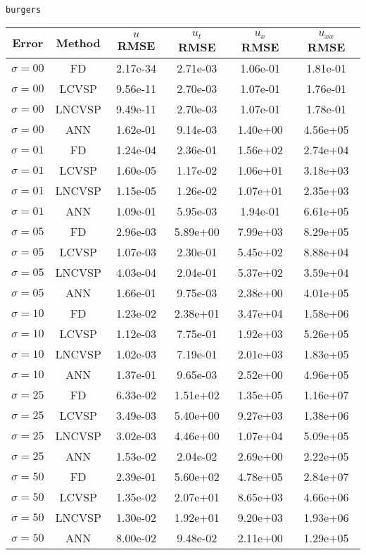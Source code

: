 \verb+burgers+
\begin{tabular}{cccccc}
    Error & Method & $u$ RMSE & $u_{t}$ RMSE & $u_{x}$ RMSE & $u_{xx}$ RMSE \\ 
    \hline
    $\sigma = 00$ & FD & 2.17e-34 & 2.71e-03 & 1.06e-01 & 1.81e-01 \\
    $\sigma = 00$ & LCVSP & 9.56e-11 & 2.70e-03 & 1.07e-01 & 1.76e-01 \\
    $\sigma = 00$ & LNCVSP & 9.49e-11 & 2.70e-03 & 1.07e-01 & 1.78e-01 \\
    $\sigma = 00$ & ANN & 1.62e-01 & 9.14e-03 & 1.40e+00 & 4.56e+05 \\
    \hline
    $\sigma = 01$ & FD & 1.24e-04 & 2.36e-01 & 1.56e+02 & 2.74e+04 \\
    $\sigma = 01$ & LCVSP & 1.60e-05 & 1.17e-02 & 1.06e+01 & 3.18e+03 \\
    $\sigma = 01$ & LNCVSP & 1.15e-05 & 1.26e-02 & 1.07e+01 & 2.35e+03 \\
    $\sigma = 01$ & ANN & 1.09e-01 & 5.95e-03 & 1.94e-01 & 6.61e+05 \\
    \hline
    $\sigma = 05$ & FD & 2.96e-03 & 5.89e+00 & 7.99e+03 & 8.29e+05 \\
    $\sigma = 05$ & LCVSP & 1.07e-03 & 2.30e-01 & 5.45e+02 & 8.88e+04 \\
    $\sigma = 05$ & LNCVSP & 4.03e-04 & 2.04e-01 & 5.37e+02 & 3.59e+04 \\
    $\sigma = 05$ & ANN & 1.66e-01 & 9.75e-03 & 2.38e+00 & 4.01e+05 \\
    \hline
    $\sigma = 10$ & FD & 1.23e-02 & 2.38e+01 & 3.47e+04 & 1.58e+06 \\
    $\sigma = 10$ & LCVSP & 1.12e-03 & 7.75e-01 & 1.92e+03 & 5.26e+05 \\
    $\sigma = 10$ & LNCVSP & 1.02e-03 & 7.19e-01 & 2.01e+03 & 1.83e+05 \\
    $\sigma = 10$ & ANN & 1.37e-01 & 9.65e-03 & 2.52e+00 & 4.96e+05 \\
    \hline
    $\sigma = 25$ & FD & 6.33e-02 & 1.51e+02 & 1.35e+05 & 1.16e+07 \\
    $\sigma = 25$ & LCVSP & 3.49e-03 & 5.40e+00 & 9.27e+03 & 1.38e+06 \\
    $\sigma = 25$ & LNCVSP & 3.02e-03 & 4.46e+00 & 1.07e+04 & 5.09e+05 \\
    $\sigma = 25$ & ANN & 1.53e-02 & 2.04e-02 & 2.69e+00 & 2.22e+05 \\
    \hline
    $\sigma = 50$ & FD & 2.39e-01 & 5.60e+02 & 4.78e+05 & 2.84e+07 \\
    $\sigma = 50$ & LCVSP & 1.35e-02 & 2.07e+01 & 8.65e+03 & 4.66e+06 \\
    $\sigma = 50$ & LNCVSP & 1.30e-02 & 1.92e+01 & 9.20e+03 & 1.93e+06 \\
    $\sigma = 50$ & ANN & 8.00e-02 & 9.48e-02 & 2.11e+00 & 1.29e+05 \\
    \hline
\end{tabular}